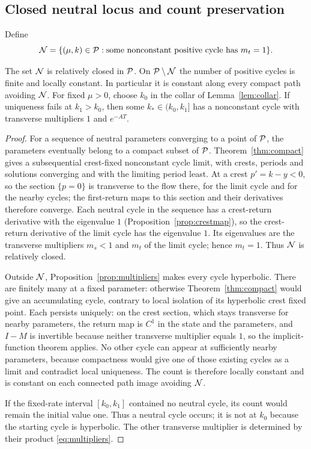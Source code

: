 \subsection{Closed neutral locus and count preservation}
Define
\begin{equation}\label{eq:neutralset}
\mathcal N=\{(\mu,k)\in\mathcal P:\text{some nonconstant positive cycle has }m_t=1\}.
\end{equation}
\begin{theorem}\label{thm:neutral}
The set $\mathcal N$ is relatively closed in $\mathcal P$. On $\mathcal P\setminus\mathcal N$ the number of positive cycles is finite and locally constant. In particular it is constant along every compact path avoiding $\mathcal N$.
For fixed $\mu>0$, choose $k_0$ in the collar of Lemma~\ref{lem:collar}. If uniqueness fails at $k_1>k_0$, then some $k_*\in(k_0,k_1]$ has a nonconstant cycle with transverse multipliers $1$ and $e^{-AT}$.
\end{theorem}
\begin{proof}
For a sequence of neutral parameters converging to a point of $\mathcal P$, the parameters eventually belong to a compact subset of $\mathcal P$. Theorem~\ref{thm:compact} gives a subsequential crest-fixed nonconstant cycle limit, with crests, periods and solutions converging and with the limiting period least. At a crest $p'=k-y<0$, so the section $\{p=0\}$ is transverse to the flow there, for the limit cycle and for the nearby cycles; the first-return maps to this section and their derivatives therefore converge. Each neutral cycle in the sequence has a crest-return derivative with the eigenvalue $1$ (Proposition~\ref{prop:crestmap}), so the crest-return derivative of the limit cycle has the eigenvalue $1$. Its eigenvalues are the transverse multipliers $m_s<1$ and $m_t$ of the limit cycle; hence $m_t=1$. Thus $\mathcal N$ is relatively closed.

Outside $\mathcal N$, Proposition~\ref{prop:multipliers} makes every cycle hyperbolic. There are finitely many at a fixed parameter: otherwise Theorem~\ref{thm:compact} would give an accumulating cycle, contrary to local isolation of its hyperbolic crest fixed point. Each persists uniquely: on the crest section, which stays transverse for nearby parameters, the return map is $C^1$ in the state and the parameters, and $I-M$ is invertible because neither transverse multiplier equals $1$, so the implicit-function theorem applies. No other cycle can appear at sufficiently nearby parameters, because compactness would give one of those existing cycles as a limit and contradict local uniqueness. The count is therefore locally constant and is constant on each connected path image avoiding $\mathcal N$.

If the fixed-rate interval $[k_0,k_1]$ contained no neutral cycle, its count would remain the initial value one. Thus a neutral cycle occurs; it is not at $k_0$ because the starting cycle is hyperbolic. The other transverse multiplier is determined by their product \eqref{eq:multipliers}.
\end{proof}
